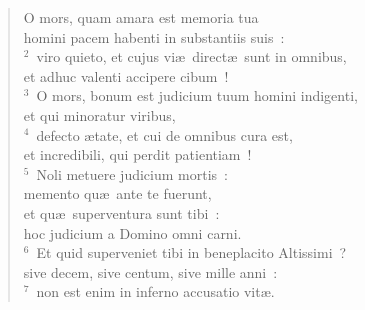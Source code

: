 \begin{flushleft}\begin{verse}\vspace{-19pt}\hspace{6pt}O mors, quam amara est memoria tua\\\hspace{6pt} homini pacem habenti in substantiis suis~:\\
${}^{2}$~viro quieto, et cujus vi\ae\ direct\ae\ sunt in omnibus,\\ et adhuc valenti accipere cibum~!\\
${}^{3}$~O mors, bonum est judicium tuum homini indigenti,\\ et qui minoratur viribus,\\
${}^{4}$~defecto \ae tate, et cui de omnibus cura est,\\ et incredibili, qui perdit patientiam~!\\
${}^{5}$~Noli metuere judicium mortis~:\\ memento qu\ae\ ante te fuerunt,\\ et qu\ae\ superventura sunt tibi~:\\ hoc judicium a Domino omni carni.\\
${}^{6}$~Et quid superveniet tibi in beneplacito Altissimi~?\\ sive decem, sive centum, sive mille anni~:\\
${}^{7}$~non est enim in inferno accusatio vit\ae .\end{verse}\end{flushleft}


